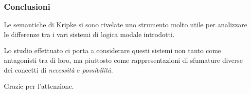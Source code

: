\documentclass[notheorem,aspectratio=169]{beamer}
\begin{document}
\begin{frame}
\frametitle{Conclusioni}
Le semantiche di Kripke si sono rivelate uno strumento molto utile per analizzare le differenze
tra i vari sistemi di logica modale introdotti.

Lo studio effettuato ci porta
a considerare questi sistemi non tanto come antagonisti tra di loro, ma piuttosto come rappresentazioni
di sfumature diverse dei concetti di \emph{necessità} e \emph{possibilità}.
\end{frame}

\begin{frame}
Grazie per l'attenzione.
\end{frame}
\end{document}
